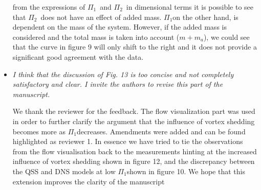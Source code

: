 \documentclass[]{article}
\newcommand{\massstiff}{\ensuremath{\Pi_1}}
\newcommand{\massdamp}{\ensuremath{\Pi_2}}
\begin{document}
\begin{itemize}
from the expressions of \massstiff \ and \massdamp \ in dimensional terms it is possible to see that \massdamp \ does not have an effect of added mass. \massstiff on the other hand, is dependent on the mass of the system. However, if the added mass is considered and the total mass is taken into account ($m+m_a$), we could see that the curve in figure 9 will only shift to the right and it does not provide a significant good agreement with the data. 
 
\item \emph{ I think that the discussion of Fig. 13 is too concise and not completely satisfactory and clear. I invite the authors to revise this part of the manuscript.}

We thank the reviewer for the feedback. The flow visualization part was used in order to further clarify the argument that the influence of vortex shedding becomes more as \massstiff decreases. Amendments were added and can be found highlighted as reviewer 1. In essence we have tried to tie the observations from the flow visualisation back to the measurements hinting at the increased influence of vortex shedding shown in figure 12, and the discrepancy between the QSS and DNS models at low \massstiff shown in figure 10. We hope that this extension improves the clarity of the manuscript






\end{itemize}
\end{document}

